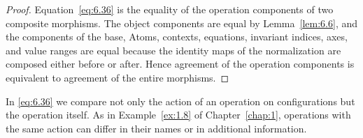 \begin{proof}

Equation~\eqref{eq:6.36} is the equality of the operation components of two composite
morphisms.
The object components are equal by Lemma~\ref{lem:6.6}, and the components of the base,
Atoms, contexts, equations, invariant indices, axes, and value ranges are equal because the
identity maps of the normalization are composed either before or after.
Hence agreement of the operation components is equivalent to agreement of the entire
morphisms.

\end{proof}

In \eqref{eq:6.36} we compare not only the action of an operation on configurations but the
operation itself.
As in Example~\ref{ex:1.8} of Chapter~\ref{chap:1}, operations with the same action can
differ in their names or in additional information.

